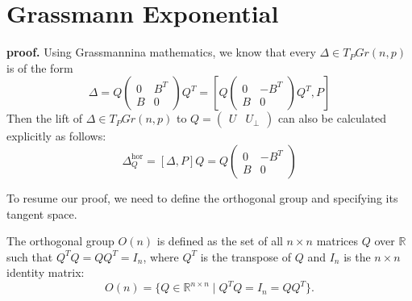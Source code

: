 \section{Grassmann Exponential}
\label{appendix:grassmann-proof}

\updaterule*

{\bf proof.} Using Grassmannina mathematics, we know that every \( \Delta \in T_P Gr(n,p) \) is of the form  
\begin{equation}
     \Delta = Q \begin{pmatrix} 0 & B^T \\ B & 0 \end{pmatrix} Q^T = \left[ Q \begin{pmatrix} 0 & -B^T \\ B & 0 \end{pmatrix} Q^T, P \right]
\end{equation}
Then the lift of \( \Delta \in T_P Gr(n,p) \) to \( Q = \begin{pmatrix} U & U_{\perp} \end{pmatrix} \) can also be calculated explicitly as follows:
\begin{equation}
    \Delta^{\text{hor}}_Q = [\Delta, P] Q = Q \begin{pmatrix} 0 & -B^T \\ B & 0 \end{pmatrix}
\end{equation}

To resume our proof, we need to define the orthogonal group and specifying its tangent space.
\begin{definition}\label{def:orthogroup}
 The orthogonal group \( O(n) \) is defined as the set of all \( n \times n \) matrices \( Q \) over \( \mathbb{R} \) such that \( Q^T Q = Q Q^T = I_n \), where \( Q^T \) is the transpose of \( Q \) and \( I_n \) is the \( n \times n \) identity matrix:
 \begin{equation*}
O(n) = \{ Q \in \mathbb{R}^{n \times n} \mid Q^T Q = I_n = Q Q^T \}.
 \end{equation*}
 \end{definition}
 
